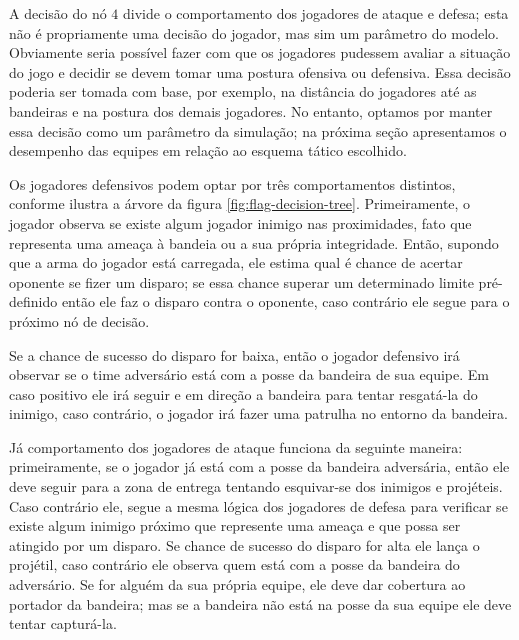 \documentclass[preprint,12pt]{elsarticle}
\begin{document}
A decisão do nó $4$ divide o comportamento dos jogadores de ataque e defesa; esta não é propriamente uma decisão do jogador, mas sim um parâmetro do modelo. Obviamente seria possível fazer com que os jogadores pudessem avaliar a situação do jogo e decidir se devem tomar uma postura ofensiva ou defensiva. Essa decisão poderia ser tomada com base, por exemplo, na distância do jogadores até as bandeiras e na postura dos demais jogadores. No entanto, optamos por manter essa decisão como um parâmetro da simulação; na próxima seção apresentamos o desempenho das equipes em relação ao esquema tático escolhido.

Os jogadores defensivos podem optar por três comportamentos distintos, conforme ilustra a árvore da figura \ref{fig:flag-decision-tree}. Primeiramente, o jogador observa se existe algum jogador inimigo nas proximidades, fato que representa uma ameaça à bandeia ou a sua própria integridade. Então, supondo que a arma do jogador está carregada, ele estima qual é chance de acertar oponente se fizer um disparo; se essa chance superar um determinado limite pré-definido então ele faz o disparo contra o oponente, caso contrário ele segue para o próximo nó de decisão.

Se a chance de sucesso do disparo for baixa, então o jogador defensivo irá observar se o time adversário está com a posse da bandeira de sua equipe. Em caso positivo ele irá seguir e em direção a bandeira para tentar resgatá-la do inimigo, caso contrário, o jogador irá fazer uma patrulha no entorno da bandeira.

Já comportamento dos jogadores de ataque funciona da seguinte maneira: primeiramente, se o jogador já está com a posse da bandeira adversária, então ele deve seguir para a zona de entrega tentando esquivar-se dos inimigos e projéteis. Caso contrário ele, segue a mesma lógica dos jogadores de defesa para verificar se existe algum inimigo próximo que represente uma ameaça e que possa ser atingido por um disparo. Se chance de sucesso do disparo for alta ele lança o projétil, caso contrário ele observa quem está com a posse da bandeira do adversário. Se for alguém da sua própria equipe, ele deve dar cobertura ao portador da bandeira; mas se a bandeira não está na posse da sua equipe ele deve tentar capturá-la.
\end{document}
